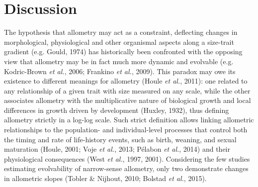 \documentclass[12pt,twoside]{report}
\begin{document}
\section{Discussion}\label{discussion-1}

The hypothesis that allometry may act as a constraint, deflecting
changes in morphological, physiological and other organismal aspects
along a size-trait gradient (e.g. Gould, 1974) has historically been
confronted with the opposing view that allometry may be in fact much
more dynamic and evolvable (e.g. Kodric-Brown \emph{et al.}, 2006;
Frankino \emph{et al.}, 2009). This paradox may owe its existence to
different meanings for allometry (Houle \emph{et al.}, 2011): one
related to any relationship of a given trait with size measured on any
scale, while the other associates allometry with the multiplicative
nature of biological growth and local differences in growth driven by
development (Huxley, 1932), thus defining allometry strictly in a
log-log scale. Such strict definition allows linking allometric
relationships to the population- and individual-level processes that
control both the timing and rate of life-history events, such as birth,
weaning, and sexual maturation (Houle, 2001; Voje \emph{et al.}, 2013;
Pélabon \emph{et al.}, 2014) and their physiological consequences (West
\emph{et al.}, 1997, 2001). Considering the few studies estimating
evolvability of narrow-sense allometry, only two demonstrate changes in
allometric slopes (Tobler \& Nijhout, 2010; Bolstad \emph{et al.},
2015).
\end{document}
